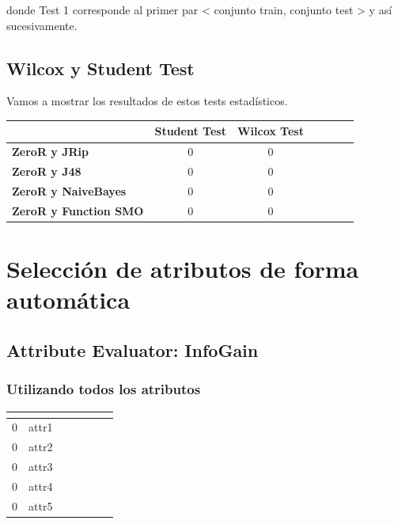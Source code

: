 \documentclass[11pt,a4paper,twoside]{tesis}
\begin{document}
donde Test 1 corresponde al primer par < conjunto train, conjunto test > y así sucesivamente.

\subsection{Wilcox y Student Test}

Vamos a mostrar los resultados de estos tests estadísticos.

\begin{table}[h]
\centering
\begin{tabular}{|l|c|c|c|c|c|c|}
\hline
\textbf{}  & \textbf{Student Test} & \textbf{Wilcox Test} \\ \hline
\textbf{ZeroR y JRip}  & 0 & 0 \\ \hline
\textbf{ZeroR y J48}  & 0 & 0 \\ \hline
\textbf{ZeroR y NaiveBayes}  & 0 & 0 \\ \hline
\textbf{ZeroR y Function SMO}  & 0 & 0 \\ \hline
\end{tabular}
\end{table}

\section{Selección de atributos de forma automática}

\subsection*{Attribute Evaluator: InfoGain}

\subsubsection{Utilizando todos los atributos}

\begin{table}[h]
\centering
\begin{tabular}{|l|c|c|c|c|c|c|}
\hline
\textbf{}  & \textbf{}  \\ \hline
0  & attr1\\ \hline
0  & attr2\\ \hline
0  & attr3\\ \hline
0 & attr4\\ \hline
0 & attr5\\ \hline
\end{tabular}
\end{table}
\end{document}
